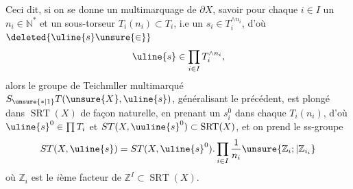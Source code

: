 
Ceci dit, si on se donne un
multimarquage de $\partial X$, savoir pour
chaque $i\in I$ un $n_i\in\mathbb N^*$ et un
sous-torseur $T_i(n_i)\subset T_i$,  i.e
un $s_i\in T_i^{\wedge n_i}$, d'où $\deleted{\uline{s}\unsure{\in}}$
\[
\uline{s}\in\prod_{i\in I}T_i^{\wedge n_i},
\]
alors le groupe de Teichmller multimarqué
$S_{\unsure{*|1}}T(\unsure{X},\uline{s})$, généralisant le précédent, est
plongé dans $\operatorname{SRT}(X)$ de façon naturelle,
en prenant un $s_i^0$ dans chaque $T_i(n_i)$, d'où
$\uline{s}^0\in\prod T_i$ et $ST(X,\uuline{s}^0)\subset\operatorname{SRT}(X)$, et on
prend le ss-groupe
\[
ST(X,\uline{s})=ST(X,\uline{s}^0).\prod_{i\in I}\frac1{n_i}\unsure{\mathbb Z_i;|\mathbb Z_{i_i}}
\]
où $\mathbb Z_i$ est le $i$ème facteur de $\mathbb Z^I\subset\operatorname{SRT}(X)$.

